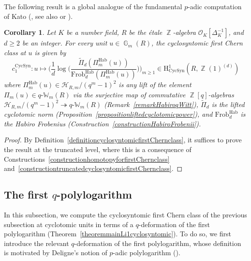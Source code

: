 \documentclass[10pt,twoside]{scrarticle}
\newlength{\mar} \setlength{\mar}{1cm}%
\newlength{\len}
\newtheorem{corollary}[theorem]{Corollary}
\theoremstyle{definition}
\DeclareMathOperator{\Z}{\mathbb{Z}}
\DeclareMathOperator{\G}{\mathbb{G}}
\newcommand{\Frob}{\mathrm{Frob}}
\newcommand{\Hab}{\mathrm{Hab}}
\newcommand{\CycSyn}{\mathrm{CycSyn}}
\newcommand{\qWm}{q\text{-}\mathbb{W}_m}
\renewcommand{\ge}{\geqslant}
\numberwithin{equation}{theorem}
\begin{document}
The following result is a global analogue of the fundamental $p$-adic computation of Kato (\cite[Corollary~2.9]{kato_explicit_1991}, see also \cite[Proposition~4.1 and Appendix]{gros_regulateurs_1990} or \cite[page 289]{somekawa_log-syntomic_1999}).

\begin{corollary}\label{corollaryformulaforfirstChernclass}
    Let $K$ be a number field, $R$ be the étale $\Z$-algebra $\mathcal{O}_K[\Delta_K^{-1}]$, and $d \ge 2$ be an integer. For every unit $u \in \G_m(R)$, the cyclosyntomic first Chern class at $u$ is given by
    $$c_1^{\CycSyn} : u \longmapsto \Big(\frac{1}{d}\log\Big(\frac{\tilde{\Pi}_d(\Pi_m^{\Hab}(u))}{\Frob_d^{\Hab}(\Pi_m^{\Hab}(u))}\Big)\Big)_{m \ge 1} \in \mathrm{H}^1_{\CycSyn}(R,\Z(1)^{(d)})$$
    where $\Pi_m^{\Hab}(u) \in \mathcal{H}_{R,m}/(q^m-1)^2$ is any lift of the element $\Pi_m(u) \in \qWm(R)$ via the surjective map of commutative $\Z[q]$-algebras $\mathcal{H}_{R,m}/(q^m-1)^2 \twoheadrightarrow \qWm(R)$ (Remark~\ref{remarkHabiroqWitt}), $\tilde{\Pi}_d$ is the lifted cyclotomic norm (Proposition~\ref{propositionliftedcyclotomicpower}), and $\Frob_d^{\Hab}$ is the Habiro Frobenius (Construction~\ref{constructionHabiroFrobenii}).
\end{corollary}

\begin{proof}
    By Definition~\ref{definitioncyclosyntomicfirstChernclass}, it suffices to prove the result at the truncated level, where this is a consequence of Constructions~\ref{constructionhomotopyforfirstChernclass} and~\ref{constructiontruncatedcyclosyntomicfirstChernclass}.
\end{proof}


\subsection{The first $q$-polylogarithm}\label{subsectionthefirstqpolylogarithm}

In this subsection, we compute the cyclosyntomic first Chern class of the previous subsection at cyclotomic units in terms of a $q$-deformation of the first polylogarithm (Theorem~\ref{theoremmainLi1cyclosyntomic}). To do so, we first introduce the relevant $q$-deformation of the first polylogarithm, whose definition is motivated by Deligne's notion of $p$-adic polylogarithm (\cite[3.2.3]{deligne_groupe_1989}).
\end{document}
